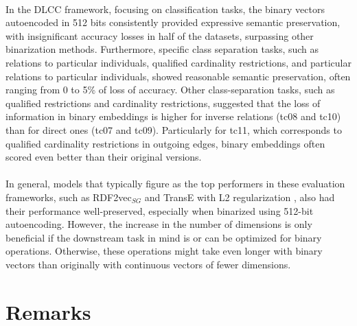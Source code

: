 \documentclass[11pt,titlepage,oneside,openany]{book}
\begin{document}
\\
In the DLCC framework, focusing on classification tasks, the binary vectors autoencoded in 512 bits consistently provided expressive semantic preservation, with insignificant accuracy losses in half of the datasets, surpassing other binarization methods. Furthermore, specific class separation tasks, such as relations to particular individuals, qualified cardinality restrictions, and particular relations to particular individuals, showed reasonable semantic preservation, often ranging from 0 to 5\% of loss of accuracy. Other class-separation tasks, such as qualified restrictions and cardinality restrictions, suggested that the loss of information in binary embeddings is higher for inverse relations (tc08 and tc10) than for direct ones (tc07 and tc09). Particularly for tc11, which corresponds to qualified cardinality restrictions in outgoing edges, binary embeddings often scored even better than their original versions.\\
\\
In general, models that typically figure as the top performers in these evaluation frameworks, such as RDF2vec$_{SG}$ and TransE with L2 regularization \cite{portisch_rdf2vec_2023}, also had their performance well-preserved, especially when binarized using 512-bit autoencoding. However, the increase in the number of dimensions is only beneficial if the downstream task in mind is or can be optimized for binary operations. Otherwise, these operations might take even longer with binary vectors than originally with continuous vectors of fewer dimensions.

\section{Remarks}
\label{sec:remarks}
\end{document}
